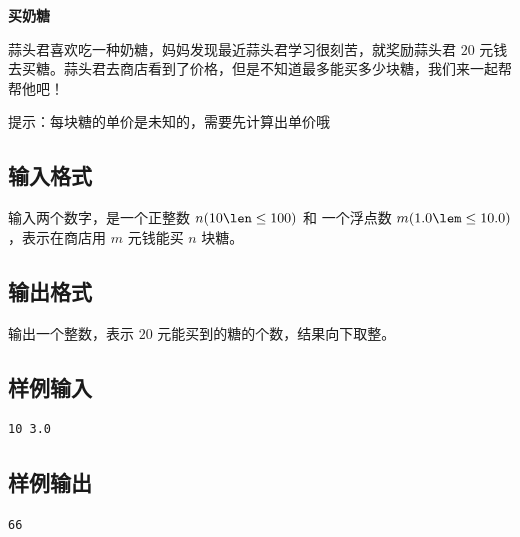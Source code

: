 \documentclass{article}
\newcommand{\problemname}[1]{\begin{center}\Large\bfseries #1\end{center}}
\begin{document}
\problemname{买奶糖}

蒜头君喜欢吃一种奶糖，妈妈发现最近蒜头君学习很刻苦，就奖励蒜头君 $20$ 元钱去买糖。蒜头君去商店看到了价格，但是不知道最多能买多少块糖，我们来一起帮帮他吧！

提示：每块糖的单价是未知的，需要先计算出单价哦~

\subsection*{输入格式}
输入两个数字，是一个正整数 $n(10\len\le100)$ 和 一个浮点数 $m(1.0\lem\le10.0)$，表示在商店用 $m$ 元钱能买 $n$ 块糖。

\subsection*{输出格式}
输出一个整数，表示 $20$ 元能买到的糖的个数，结果向下取整。

\subsection*{样例输入}
\begin{verbatim}
10 3.0
\end{verbatim}

\subsection*{样例输出}
\begin{verbatim}
66
\end{verbatim}
\end{document}
